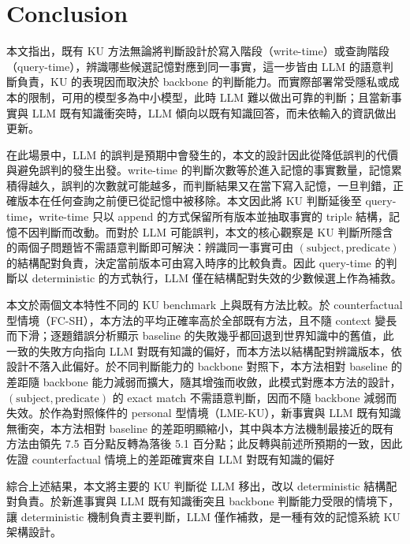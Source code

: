 \chapter{Conclusion}
\label{ch:conclusion}

本文指出，既有 KU 方法無論將判斷設計於寫入階段（write-time）或查詢階段（query-time），辨識哪些候選記憶對應到同一事實，這一步皆由 LLM 的語意判斷負責，KU 的表現因而取決於 backbone 的判斷能力。而實際部署常受隱私或成本的限制，可用的模型多為中小模型，此時 LLM 難以做出可靠的判斷；且當新事實與 LLM 既有知識衝突時，LLM 傾向以既有知識回答，而未依輸入的資訊做出更新。

在此場景中，LLM 的誤判是預期中會發生的，本文的設計因此從降低誤判的代價與避免誤判的發生出發。write-time 的判斷次數等於進入記憶的事實數量，記憶累積得越久，誤判的次數就可能越多，而判斷結果又在當下寫入記憶，一旦判錯，正確版本在任何查詢之前便已從記憶中被移除。本文因此將 KU 判斷延後至 query-time，write-time 只以 append 的方式保留所有版本並抽取事實的 triple 結構，記憶不因判斷而改動。而對於 LLM 可能誤判，本文的核心觀察是 KU 判斷所隱含的兩個子問題皆不需語意判斷即可解決：辨識同一事實可由 $(\text{subject}, \text{predicate})$ 的結構配對負責，決定當前版本可由寫入時序的比較負責。因此 query-time 的判斷以 deterministic 的方式執行，LLM 僅在結構配對失效的少數候選上作為補救。

本文於兩個文本特性不同的 KU benchmark 上與既有方法比較。於 counterfactual 型情境（FC-SH），本方法的平均正確率高於全部既有方法，且不隨 context 變長而下滑；逐題錯誤分析顯示 baseline 的失敗幾乎都回退到世界知識中的舊值，此一致的失敗方向指向 LLM 對既有知識的偏好，而本方法以結構配對辨識版本，依設計不落入此偏好。於不同判斷能力的 backbone 對照下，本方法相對 baseline 的差距隨 backbone 能力減弱而擴大，隨其增強而收斂，此模式對應本方法的設計，$(\text{subject}, \text{predicate})$ 的 exact match 不需語意判斷，因而不隨 backbone 減弱而失效。於作為對照條件的 personal 型情境（LME-KU），新事實與 LLM 既有知識無衝突，本方法相對 baseline 的差距明顯縮小，其中與本方法機制最接近的既有方法由領先 7.5 百分點反轉為落後 5.1 百分點；此反轉與前述所預期的一致，因此佐證 counterfactual 情境上的差距確實來自 LLM 對既有知識的偏好

綜合上述結果，本文將主要的 KU 判斷從 LLM 移出，改以 deterministic 結構配對負責。於新進事實與 LLM 既有知識衝突且 backbone 判斷能力受限的情境下，讓 deterministic 機制負責主要判斷，LLM 僅作補救，是一種有效的記憶系統 KU 架構設計。